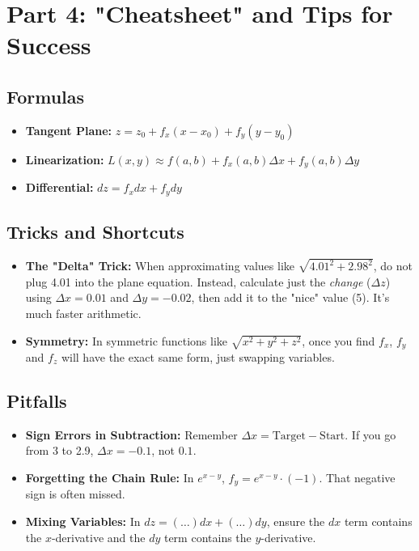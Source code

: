 \documentclass{article}
\begin{document}
\section{Part 4: "Cheatsheet" and Tips for Success}

\subsection{Formulas}
\begin{itemize}
    \item \textbf{Tangent Plane:} $z = z_0 + f_x(x-x_0) + f_y(y-y_0)$
    \item \textbf{Linearization:} $L(x,y) \approx f(a,b) + f_x(a,b)\Delta x + f_y(a,b)\Delta y$
    \item \textbf{Differential:} $dz = f_x dx + f_y dy$
\end{itemize}

\subsection{Tricks and Shortcuts}
\begin{itemize}
    \item \textbf{The "Delta" Trick:} When approximating values like $\sqrt{4.01^2 + 2.98^2}$, do not plug 4.01 into the plane equation. Instead, calculate just the \textit{change} ($\Delta z$) using $\Delta x = 0.01$ and $\Delta y = -0.02$, then add it to the "nice" value (5). It's much faster arithmetic.
    \item \textbf{Symmetry:} In symmetric functions like $\sqrt{x^2+y^2+z^2}$, once you find $f_x$, $f_y$ and $f_z$ will have the exact same form, just swapping variables.
\end{itemize}

\subsection{Pitfalls}
\begin{itemize}
    \item \textbf{Sign Errors in Subtraction:} Remember $\Delta x = \text{Target} - \text{Start}$. If you go from 3 to 2.9, $\Delta x = -0.1$, not $0.1$.
    \item \textbf{Forgetting the Chain Rule:} In $e^{x-y}$, $f_y = e^{x-y} \cdot (-1)$. That negative sign is often missed.
    \item \textbf{Mixing Variables:} In $dz = (\dots)dx + (\dots)dy$, ensure the $dx$ term contains the $x$-derivative and the $dy$ term contains the $y$-derivative.
\end{itemize}
\end{document}
